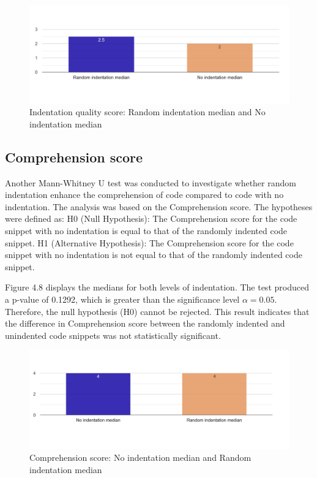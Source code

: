 \begin{figure} [H]
  \centering
  \includegraphics[scale=0.4]{figures/r-0-q5.png}
  \caption{Indentation quality score: Random indentation median and No indentation median}
  \label{fig:AnhangsChor}
\end{figure}


\subsection{Comprehension score}
Another Mann-Whitney U test was conducted to investigate whether random indentation enhance the comprehension  of code compared to code with no indentation. The analysis was based on the Comprehension score. The hypotheses were defined as: H0 (Null Hypothesis): The Comprehension score for the code snippet with no indentation is equal to that of the randomly indented code snippet. H1 (Alternative Hypothesis): The Comprehension score for the code snippet with no indentation is not equal to that of the randomly indented code snippet.

Figure 4.8 displays the medians for both levels of indentation.
The test produced a p-value of 0.1292, which is greater than the significance level \(\alpha = 0.05\). Therefore, the null hypothesis (H0) cannot be rejected. This result indicates that the difference in Comprehension score between the randomly indented and unindented code snippets was not statistically significant.


\begin{figure} [H]
  \centering
  \includegraphics[scale=0.4]{figures/0-r-q3.png}
  \caption{Comprehension score:  No indentation median and Random indentation median}
  \label{fig:AnhangsChor}
\end{figure}




